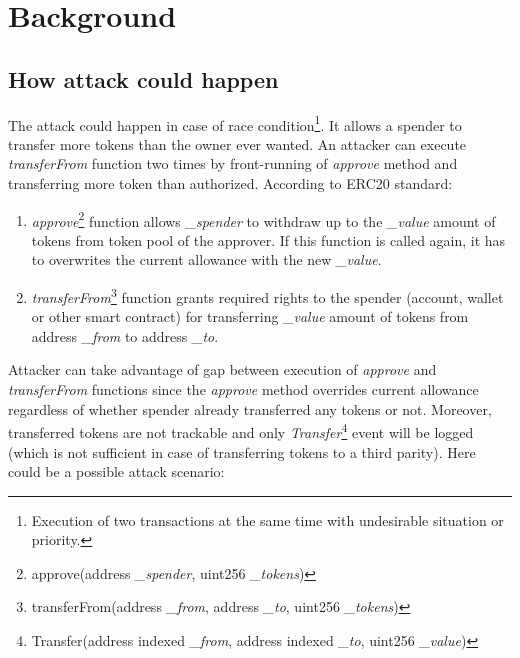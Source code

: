 
\section{Background}
\subsection{How attack could happen}
The attack could happen in case of race condition\footnote{Execution of two transactions at the same time with undesirable situation or priority.}. It allows a spender to transfer more tokens than the owner ever wanted. An attacker can execute \textit{transferFrom} function two times by front-running of \textit{approve} method and transferring more token than authorized. According to ERC20 standard:
\begin{enumerate}[label=(\alph*)]
	\item \textit{approve}\footnote{approve(address \textit{\_spender}, uint256 \textit{\_tokens})} function allows \textit{\_spender} to withdraw up to the \textit{\_value} amount of tokens from token pool of the approver. If this function is called again, it has to overwrites the current allowance with the new \textit{\_value}.
	\item \textit{transferFrom}\footnote{transferFrom(address \textit{\_from}, address \textit{\_to}, uint256 \textit{\_tokens})} function grants required rights to the spender (account, wallet or other smart contract) for transferring \textit{\_value} amount of tokens from address \textit{\_from} to address \textit{\_to}.
\end{enumerate}
Attacker can take advantage of gap between execution of \textit{approve} and \textit{transferFrom} functions since the \textit{approve} method overrides current allowance regardless of whether spender already transferred any tokens or not. Moreover, transferred tokens are not trackable and only \textit{Transfer}\footnote{Transfer(address indexed \textit{\_from}, address indexed \textit{\_to}, uint256 \textit{\_value})} event will be logged (which is not sufficient in case of transferring tokens to a third parity). Here could be a possible attack scenario:
